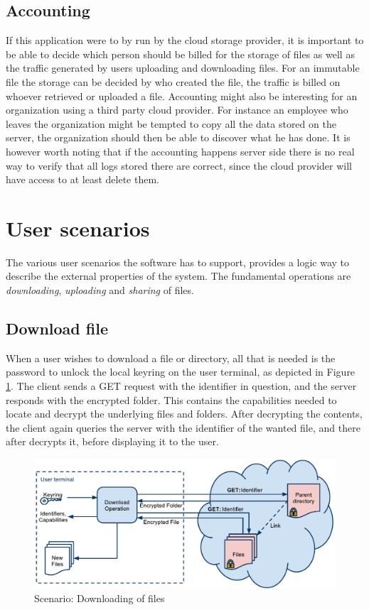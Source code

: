 \documentclass[pdftex,english,10pt,b5paper,twoside]{book}
\begin{document}
\subsection{Accounting}
If this application were to by run by the cloud storage provider, it is
important to be able to decide which person should be billed for the storage of
files as well as the traffic generated by users uploading and downloading
files. For an immutable file the storage can be decided by who created the
file, the traffic is billed on whoever retrieved or uploaded a file.
Accounting might also be interesting for an organization using a third party
cloud provider. For instance an employee who leaves the organization might be
tempted to copy all the data stored on the server, the organization should then
be able to discover what he has done. It is however worth noting that if the
accounting happens server side there is no real way to verify that all logs
stored there are correct, since the cloud provider will have access to at least
delete them.

\section{User scenarios}

The various user scenarios the software has to support, provides a logic way to
describe the external properties of the system. The fundamental operations are
\emph{downloading}, \emph{uploading} and \emph{sharing} of files.

\subsection{Download file}

When a user wishes to download a file or directory, all that is needed is the
password to unlock the local keyring on the user terminal, as depicted in Figure
\ref{fig:AS:download}. The client sends a GET request with the identifier in
question, and the server responds with the encrypted folder. This contains the
capabilities needed to locate and decrypt the underlying files and folders.
After decrypting the contents, the client again queries the server with the
identifier of the wanted file, and there after decrypts it, before displaying it
to the user.

\begin{figure}[h!]
    \centering
    \includegraphics[width=\columnwidth]{ArchitectureDownload.pdf}
    \caption{Scenario: Downloading of files}
    \label{fig:AS:download}
\end{figure}
\end{document}
